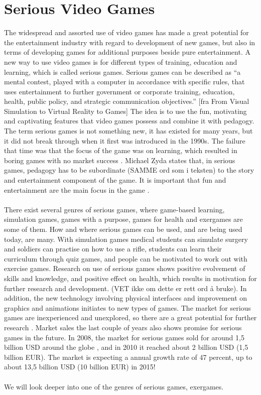 \section{Serious Video Games}
The widespread and assorted use of video games has made a great potential for the entertainment industry with regard to development of new games, but also in terms of developing games for additional purposes beside pure entertainment. A new way to use video games is for 
different types of training, education and learning, which is called serious games. Serious games can be described as “a mental contest, played with a computer in accordance with specific rules, that uses entertainment to further government or corporate training, education, health, public policy, and strategic communication objectives.” [fra From Visual Simulation to Virtual Reality to Games] The idea is to use the fun, motivating and captivating features that video games possess and combine it with pedagogy. The term serious games is not something new, it has existed for many years, but it did not break through when it first was introduced in the 1990s. The failure that time was that the focus of the game was on learning, which resulted in boring games with no market success \cite{susi2007serious}. Michael Zyda states that, in serious games, pedagogy has to be subordinate (SAMME ord som i teksten) to the story and entertainment component of the game. It is important that fun and entertainment are the main focus in the game \cite{zyda2005visual}. \\ \\
There exist several genres of serious games, where game-based learning, simulation games, games with a purpose, games for health and exergames are some of them. How and where serious games can be used, and are being used today, are many. With simulation games medical students can simulate surgery and soldiers can practise on how to use a rifle, students can learn their curriculum through quiz games, and people can be motivated to work out with exercise games. Research on use of serious games shows positive evolvement of skills and knowledge, and positive effect on health, which results in motivation for further research and development. (VET ikke om dette er rett ord å bruke). In addition, the new technology involving physical interfaces and improvement on graphics and animations initiates to new types of games. The market for serious games are inexperienced and unexplored, so there are a great potential for further research \cite{alfingewang}. Market sales the last couple of years also shows promise for serious games in the future. In 2008, the market for serious games sold for around 1,5 billion USD around the globe \cite{alfingewang}, and in 2010 it reached about 2 billion USD (1,5 billion EUR). The market is expecting a annual growth rate of 47 percent, up to about 13,5 billion USD (10 billion EUR) in 2015! \cite{idate} \\ \\
We will look deeper into one of the genres of serious games, exergames.  

